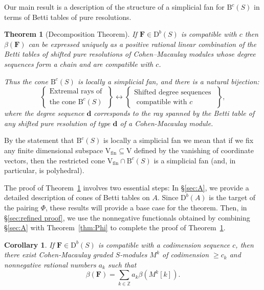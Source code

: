 \documentclass[12pt]{amsart}
\newtheorem{cor}[lemma]{Corollary}
\newtheorem{thm}[lemma]{Theorem}
\theoremstyle{definition}
\theoremstyle{remark}
\newcommand{\ZZ}{\mathbb{Z}}
\newcommand{\VV}{\mathrm{V}}
\newcommand{\cc}{c}
\newcommand{\dd}{\mathbf{d}}
\newcommand{\FF}{\mathbf{F}}
\newcommand{\DD}{\mathrm{D}}
\newcommand{\BBQ}{\mathrm{B}}
\begin{document}
Our main result is a description of the structure of a simplicial fan for $\BBQ^{\cc}(S)$ in terms of  Betti tables of pure resolutions.  

\begin{thm}[Decomposition Theorem]\label{thm:extremal rays refined}
If $\FF\in \DD^b(S)$  is compatible with $\cc$ then  $\beta(\FF)$ can be expressed
uniquely as a positive rational linear combination of the Betti tables of shifted pure resolutions of Cohen--Macaulay modules whose degree sequences form a chain and are compatible with $\cc$.

Thus the cone $\BBQ^{\cc}(S)$ is locally a simplicial fan, and there is a natural bijection:
\[
\left\{
\begin{matrix}
\text{Extremal rays of }\\
\text{the cone } \BBQ^{\cc}(S)
\end{matrix}
\right\}
\longleftrightarrow
\left\{
\begin{matrix}
\text{Shifted degree sequences }\\
\text{ compatible with $\cc$}
\end{matrix}
\right\},
\]
where the  degree sequence $\dd$ corresponds to the ray spanned by 
the Betti table of any shifted pure resolution of type $\dd$ of a Cohen-Macaulay module. 
\end{thm}

By the statement that $\BBQ^{\cc}(S)$ is locally a simplicial fan we mean that if we fix any finite dimensional subspace $\VV_{\text{fin}}\subseteq \VV$ defined by the vanishing of coordinate vectors, then the restricted cone $\VV_{\text{fin}}\cap \BBQ^{\cc}(S)$ is a simplicial fan (and, in particular,
is polyhedral). 

The proof of Theorem~\ref{thm:extremal rays refined} involves two essential steps:  In \S\ref{sec:A}, we provide a detailed description of cones of Betti tables on $A$.  Since $\DD^b(A)$ is the target of the pairing $\Phi$, these results will provide a base case for the theorem.  Then, in \S\ref{sec:refined proof}, 
we use the nonnegative functionals obtained by combining  \S\ref{sec:A} with Theorem~\ref{thm:Phi} to complete the proof of Theorem~\ref{thm:extremal rays refined}. 

\begin{cor}\label{cor:decompose refined}
If $\FF\in \DD^b(S)$ is compatible with a codimension sequence $\cc$,
then there exist Cohen-Macaulay graded $S$-modules $M^k$ of codimension $\geq \cc_k$ and nonnegative rational numbers $a_k$ such that
\[
\beta(\FF)=\sum_{k\in \ZZ} a_k\beta(M^k[k]).
\]
\end{cor}
\end{document}

